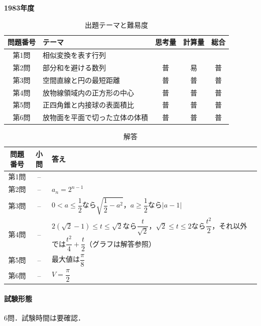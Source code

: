 \documentclass[../../main.tex]{subfiles}
\begin{document}
\begin{center}
  {\fontsize{48pt}{58pt}\selectfont \textbf{1983}\normalsize\textbf{年度}}
\end{center}

\begin{table}[htb]
  \centering
  \caption{出題テーマと難易度}
  \begin{tabular}{|c|p{6.2cm}|c|c|c|}
    \hline
    \textbf{問題番号} & \textbf{テーマ} & \textbf{思考量} & \textbf{計算量} & \textbf{総合} \\
    \hline
    第1問 & 相似変換を表す行列 &  &  &  \\
    \hline
    第2問 & 部分和を避ける数列 & 普 & 易 & 普 \\
    \hline
    第3問 & 空間直線と円の最短距離 & 普 & 普 & 普 \\
    \hline
    第4問 & 放物線領域内の正方形の中心 & 普 & 普 & 普 \\
    \hline
    第5問 & 正四角錐と内接球の表面積比 & 普 & 普 & 普 \\
    \hline
    第6問 & 放物面を平面で切った立体の体積 & 普 & 普 & 普 \\
    \hline
  \end{tabular}
\end{table}

\begin{table}[htb]
  \centering
  \caption{解答}
  \renewcommand{\arraystretch}{1.4}
  \begin{tabular}{|c|c|p{9cm}|}
    \hline
    \textbf{問題番号} & \textbf{小問} & \textbf{答え} \\
    \hline
    第1問 & -- & \\
    \hline
    第2問 & -- & $a_n=2^{n-1}$ \\
    \hline
    第3問 & -- & $0<a\le\dfrac{1}{2}$なら$\sqrt{\dfrac{1}{2}-a^2}$，$a\ge\dfrac{1}{2}$なら$|a-1|$ \\
    \hline
    第4問 & -- & $2(\sqrt{2}-1)\le t\le\sqrt{2}$なら$\dfrac{t}{\sqrt{2}}$，$\sqrt{2}\le t\le2$なら$\dfrac{t^2}{2}$，それ以外では$\dfrac{t^2}{4}+\dfrac{t}{2}$（グラフは解答参照） \\
    \hline
    第5問 & -- & 最大値は$\dfrac{\pi}{8}$ \\
    \hline
    第6問 & -- & $V=\dfrac{\pi}{2}$ \\
    \hline
  \end{tabular}
\end{table}

\paragraph{試験形態}
6問．試験時間は要確認．
\end{document}
